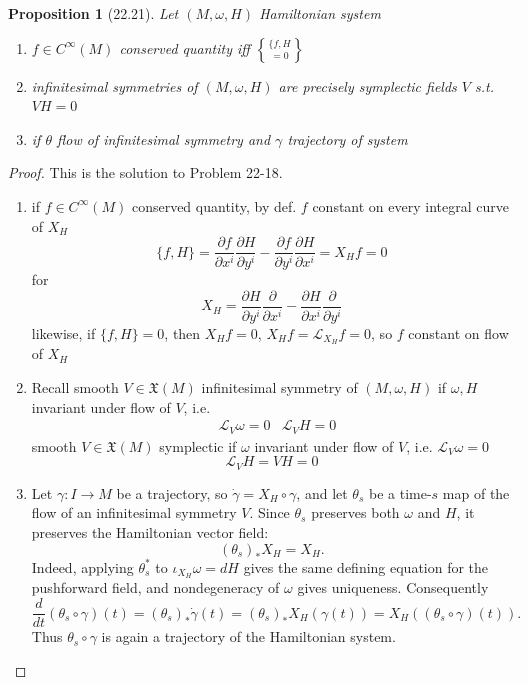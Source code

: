 \documentclass[11pt]{amsart}
\newtheorem{proposition}{Proposition}
\theoremstyle{definition}
\begin{document}
\begin{proposition}[22.21]
Let $(M,\omega,H)$ Hamiltonian system
\begin{enumerate}
\item[(a)] $f \in C^{\infty}(M)$ conserved quantity iff $\lbrace f,H\brace =0$
\item[(b)] infinitesimal symmetries of $(M, \omega,H)$ are precisely symplectic fields $V$ s.t. $VH=0$
\item[(c)] if $\theta$ flow of infinitesimal symmetry and $\gamma$ trajectory of system
\end{enumerate}
\end{proposition}

\begin{proof}
This is the solution to Problem 22-18.

\begin{enumerate}
\item[(a)] if $f\in C^{\infty}(M)$ conserved quantity, by def. $f$ constant on every integral curve of $X_H$
\[
\lbrace f,H\rbrace = \frac{ \partial f}{ \partial x^i} \frac{ \partial H}{ \partial y^i} - \frac{ \partial f}{ \partial y^i} \frac{ \partial H}{ \partial x^i} = X_H f = 0
\]
for
\[
X_H = \frac{ \partial H}{ \partial y^i} \frac{ \partial }{ \partial x^i} - \frac{ \partial H}{ \partial x^i} \frac{ \partial }{ \partial y^i}
\]
likewise, if $\lbrace f,H \rbrace =0$, then $X_Hf =0$, $X_Hf = \mathcal{L}_{X_H} f= 0 $, so $f$ constant on flow of $X_H$
\item[(b)] Recall smooth $V \in \mathfrak{X}(M)$ infinitesimal symmetry of $(M,\omega,H)$ if $\omega, H$ invariant under flow of $V$, i.e.
\[
\begin{aligned}
  & \mathcal{L}_V \omega =0
  &  \mathcal{L}_VH = 0
\end{aligned}
\]
smooth $V\in \mathfrak{X}(M)$ symplectic if $\omega$ invariant under flow of $V$, i.e. $\mathcal{L}_V\omega =0$
\[
\mathcal{L}_VH = VH = 0
\]
\item[(c)] Let $\gamma:I\to M$ be a trajectory, so
$\dot\gamma=X_H\circ\gamma$, and let $\theta_s$ be a time-$s$ map of
the flow of an infinitesimal symmetry $V$.  Since $\theta_s$ preserves
both $\omega$ and $H$, it preserves the Hamiltonian vector field:
\[
  (\theta_s)_*X_H=X_H.
\]
Indeed, applying $\theta_s^*$ to
$\iota_{X_H}\omega=dH$ gives the same defining equation for the
pushforward field, and nondegeneracy of $\omega$ gives uniqueness.
Consequently
\[
 \frac{d}{dt}(\theta_s\circ\gamma)(t)
   =(\theta_s)_*\dot\gamma(t)
   =(\theta_s)_*X_H(\gamma(t))
   =X_H((\theta_s\circ\gamma)(t)).
\]
Thus $\theta_s\circ\gamma$ is again a trajectory of the Hamiltonian
system.
\end{enumerate}
\end{proof}
\end{document}
